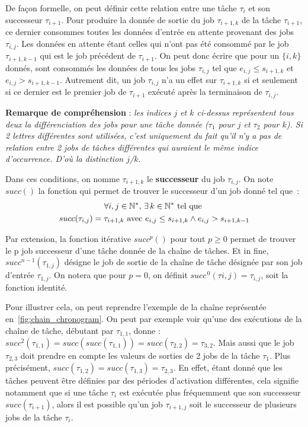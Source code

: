 \documentclass[french, a4paper, 11pt, twoside, pdftex]{StyleThese}
\begin{document}
	    De façon formelle, on peut définir cette relation entre une tâche $\tau_i$ et son successeur $\tau_{i+1}$. Pour produire la donnée de sortie du job $\tau_{i+1,k}$ de la tâche $\tau_{i+1}$, ce dernier consommes toutes les données d'entrée en attente provenant des jobs $\tau_{i,j}$. Les données en attente étant celles qui n'ont pas été consommé par le job $\tau_{i+1,k-1}$ qui est le job précédent de $\tau_{i+1}$. On peut donc écrire que pour un $\{i,k\}$ donnés, sont consommés les données de tous les jobs $\tau_{i,j}$ tel que $ e_{i,j} \leq s_{i+1, k}$ et $e_{i,j} > s_{i+1, k-1}$. Autrement dit, un job $\tau_{i,j}$ n'a un effet sur $\tau_{i+1,k}$ si et seulement si ce dernier est le premier job de $\tau_{i+1}$ exécuté après la terminaison de $\tau_{i,j}$.
	    
	    \textbf{Remarque de compréhension} : \textit{les indices $j$ et $k$ ci-dessus représentent tous deux la différenciation des jobs pour une tâche donnée ($\tau_1$ pour $j$ et $\tau_2$ pour $k$). Si 2 lettres différentes sont utilisées, c'est uniquement du fait qu'il n'y a pas de relation entre 2 jobs de tâches différentes qui auraient le même indice d'occurrence. D'où la distinction $j$/$k$}.
	    
		Dans ces conditions, on nomme $\tau_{i+1,k}$ le \textbf{successeur} du job $\tau_{i,j}$. On note $succ()$ la fonction qui permet de trouver le successeur d'un job donné tel que~: 
		\begin{multline*}
		\forall i,j \in \mathbb{N}^*, \, \exists \, k \in  \mathbb{N}^*  \textrm{ tel que }  \\
		 succ(\tau_{i,j}) = \tau_{i+1,k} \textup{ avec } e_{i,j} \leq s_{i+1,k} \wedge e_{i,j} > s_{i+1,k-1}
		\end{multline*}
	
		Par extension, la fonction itérative $succ^{p}()$ pour tout $p \geq 0$ permet de trouver le p job successeur d'une tâche donnée de la chaîne de tâches. Et in fine, $succ^{n-1}(\tau_{1,j})$ désigne le job de sortie de la chaîne de tâche désignée par son job d'entrée $\tau_{1,j}$. On notera que pour $p = 0$, on définit $succ^{\,0}(\tau{i,j}) = \tau_{i,j}$, soit la fonction identité.
		
		Pour illustrer cela, on peut reprendre l'exemple de la chaîne représentée en~\autoref{fig:chain_chronogram}. On peut par exemple voir qu'une des exécutions de la chaîne de tâche, débutant par $\tau_{1,1}$, donne : $succ^{2}(\tau_{1,1}) = succ(succ(\tau_{1,1})) = succ(\tau_{2,2}) = \tau_{3,2}$. Mais aussi que le job $ \tau_{2,3} $ doit prendre en compte les valeurs de sorties de 2 jobs de la tâche $ \tau_1 $. Plus précisément, $succ(\tau_{1,2}) = succ(\tau_{1,3}) = \tau_{2,3} $. %
		En effet, étant donné que les tâches peuvent être définies par des périodes d'activation différentes, cela signifie notamment que si une tâche $\tau_i$ est exécutée plus fréquemment que son successeur $succ(\tau_{i+1})$, alors il est possible  qu'un job $\tau_{i+1,j}$ soit le successeur de plusieurs jobs de la tâche $\tau_{i}$.
		
\end{document}
